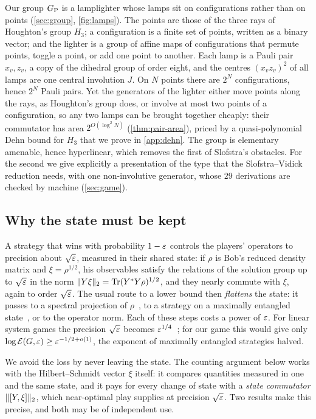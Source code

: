 Our group $G_{\mathrm P}$ is a lamplighter whose lamps sit on configurations rather than on points (\cref{sec:group}, \cref{fig:lamps}). The points
are those of the three rays of Houghton's group $H_3$; a configuration is a finite set of points, written as a binary vector; and the
lighter is a group of affine maps of configurations that permute points, toggle a point, or add one point to another. Each lamp is a Pauli
pair $x_v,z_v$, a copy of the dihedral group of order eight, and the centres $(x_vz_v)^2$ of all lamps are one central involution $J$. On
$N$ points there are $2^N$ configurations, hence $2^N$ Pauli pairs. Yet the generators of the lighter either move points along the rays,
as Houghton's group does, or involve at most two points of a configuration, so any two lamps can be brought together cheaply: their
commutator has area $2^{O(\log^2N)}$ (\cref{thm:pair-area}),
priced by a quasi-polynomial Dehn bound for $H_3$ that we prove in \cref{app:dehn}. The group is elementary amenable, hence hyperlinear,
which removes the first of Slofstra's obstacles. For the second we give explicitly a presentation of the type that the Slofstra--Vidick
reduction needs, with one non-involutive generator, whose $29$ derivations are checked by machine (\cref{sec:game}).



\subsection{Why the state must be kept}

A strategy that wins with probability $1-\varepsilon$ controls the players' operators to precision about $\sqrt{\varepsilon}$, measured in their shared
state: if $\rho$ is Bob's reduced density matrix and $\xi=\rho^{1/2}$, his observables satisfy the relations of the solution group up to
$\sqrt{\varepsilon}$ in the norm $\lVert Y\xi\rVert_2=\operatorname{Tr}(Y^*Y\rho)^{1/2}$, and they nearly commute with $\xi$, again to order $\sqrt{\varepsilon}$. The usual route to a
lower bound then \emph{flattens} the state: it passes to a spectral projection of $\rho$~\cite{SV18}, to a strategy on a maximally entangled
state~\cite{Pad22}, or to the operator norm. Each of these steps costs a power of $\varepsilon$. For linear system games the precision $\sqrt{\varepsilon}$
becomes $\varepsilon^{1/4}$~\cite[Cor.~5.2]{SV18}; for our game this would give only $\log\mathcal E(G,\varepsilon)\ge\varepsilon^{-1/2+o(1)}$, the exponent of
maximally entangled strategies halved.

We avoid the loss by never leaving the state. The counting argument below works with the Hilbert--Schmidt vector $\xi$ itself: it
compares quantities measured in one and the same state, and it pays for every change of state with a \emph{state commutator}
$\lVert [Y,\xi]\rVert_2$, which near-optimal play supplies at precision $\sqrt{\varepsilon}$. Two results make this precise, and both may be of independent use.


